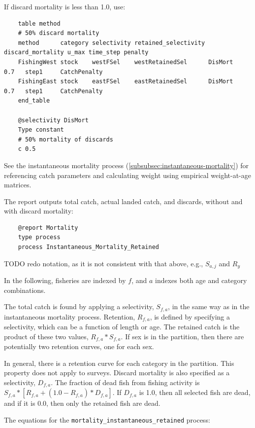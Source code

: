 If discard mortality is less than 1.0, use:

{\small{\begin{verbatim}
    table method
    # 50% discard mortality
    method      category selectivity retained_selectivity discard_mortality u_max time_step penalty
    FishingWest stock    westFSel    westRetainedSel      DisMort           0.7   step1     CatchPenalty
    FishingEast stock    eastFSel    eastRetainedSel      DisMort           0.7   step1     CatchPenalty
    end_table

    @selectivity DisMort
    Type constant
    # 50% mortality of discards
    c 0.5
\end{verbatim}}}

See the instantaneous mortality process (\ref{subsubsec:instantaneous-mortality}) for referencing catch parameters and calculating weight using empirical weight-at-age matrices.

The report outputs total catch, actual landed catch, and discards, without and with discard mortality:

{\small{\begin{verbatim}
    @report Mortality
    type process
    process Instantaneous_Mortality_Retained
\end{verbatim}}}

TODO redo notation, as it is not consistent with that above, e.g., $S_{a,j}$ and $R_y$

In the following, fisheries are indexed by $f$, and $a$ indexes both age and category combinations.

The total catch is found by applying a selectivity, $S_{f,a}$, in the same way as in the instantaneous mortality process. Retention, $R_{f,a}$, is defined by specifying a selectivity, which can be a function of length or age. The retained catch is the product of these two values, $R_{f,a} * S_{f,a}$. If sex is in the partition, then there are potentially two retention curves, one for each sex.

In general, there is a retention curve for each category in the partition. This property does not apply to surveys. Discard mortality is also specified as a selectivity, $D_{f,a}$. The fraction of dead fish from fishing activity is $S_{f,a} * [ R_{f,a} + (1.0 - R_{f,a}) * D_{f,a} ]$. If $D_{f,a}$ is 1.0, then all selected fish are dead, and if it is 0.0, then only the retained fish are dead.

The equations for the \texttt{mortality\_instantaneous\_retained} process:


